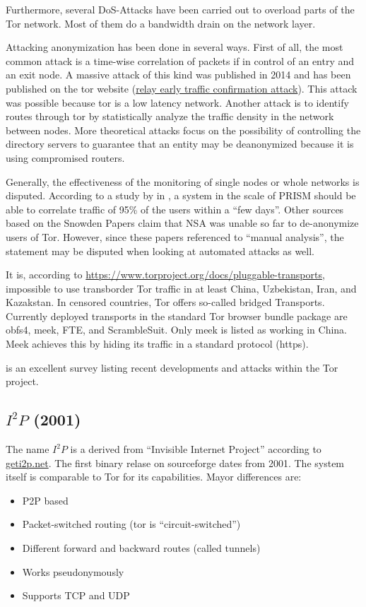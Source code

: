 Furthermore, several DoS-Attacks have been carried out to overload parts of the Tor network. Most of them do a bandwidth drain on the network layer.

Attacking anonymization has been done in several ways. First of all, the most common attack is a time-wise correlation of packets if in control of an entry and an exit node. A massive attack of this kind was published in 2014 and has been published on the tor website (\href{https://blog.torproject.org/blog/tor-security-advisory-relay-early-traffic-confirmation-attack}{relay early traffic confirmation attack}). This attack was possible because tor is a low latency network. Another attack is to identify routes through tor by statistically analyze the traffic density in the network between nodes. More theoretical attacks focus on the possibility of controlling the directory servers to guarantee that an entity may be deanonymized because it is using compromised routers.

Generally, the effectiveness of the monitoring of single nodes or whole networks is disputed. According to a study by \citeauthor{ccs2013-usersrouted} in \citeyear{ccs2013-usersrouted}\cite{ccs2013-usersrouted}, a system in the scale of PRISM should be able to correlate traffic of 95\% of the users within a ``few days''. Other sources based on the Snowden Papers claim that NSA was unable so far to de-anonymize users of  Tor. However, since these papers referenced to ``manual analysis'', the statement may be disputed when looking at automated attacks as well.

It is, according to \url{https://www.torproject.org/docs/pluggable-transports}, impossible to use transborder Tor traffic in at least China, Uzbekistan, Iran, and Kazakstan. In censored countries, Tor offers so-called bridged Transports. Currently deployed transports in the standard Tor browser bundle package are obfs4, meek, FTE, and ScrambleSuit. Only meek is listed as working in China. Meek achieves this by hiding its traffic in a standard protocol (https).

\cite{saleh2018shedding} is an excellent survey listing recent developments and attacks within the Tor project.

\subsection{\texorpdfstring{$I^2P$}{I2P} (2001)}
The name $I^2P$ is a derived from  ``Invisible Internet Project'' according to \href{https://geti2p.net/}{geti2p.net}. The first binary relase on sourceforge dates from 2001. The system itself is comparable to Tor for its capabilities. Mayor differences are:
\begin{itemize}
	\item P2P based
	\item Packet-switched routing (tor is ``circuit-switched'')
	\item Different forward and backward routes (called tunnels)
	\item Works pseudonymously
	\item Supports TCP and UDP
\end{itemize}

